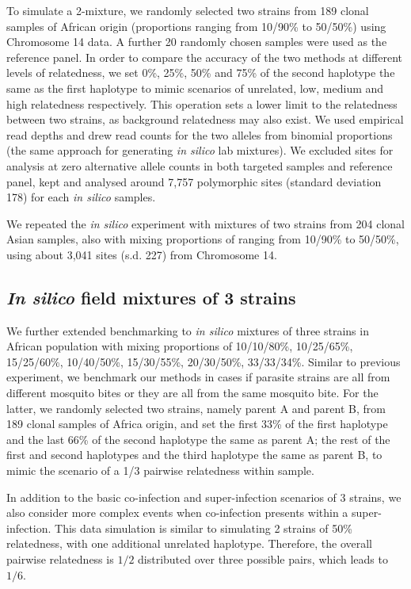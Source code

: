 \documentclass[9pt]{article}
\begin{document}
To simulate a 2-mixture, we randomly selected two strains from 189 clonal samples of African origin (proportions ranging from 10/90\% to 50/50\%) using Chromosome 14 data.  A further 20 randomly chosen samples were used as the reference panel. In order to compare the accuracy of the two methods at different levels of relatedness, we set 0\%, 25\%, 50\% and 75\% of the second haplotype the same as the first haplotype to mimic scenarios of unrelated, low, medium and high relatedness respectively. This operation sets a lower limit to the relatedness between two strains, as background relatedness may also exist. We used empirical read depths and drew read counts for the two alleles from binomial proportions (the same approach for generating {\it in silico} lab mixtures).
We excluded sites for analysis at zero alternative allele counts in both targeted samples and reference panel, kept and analysed around 7,757 polymorphic sites (standard deviation 178) for each {\it in silico} samples.


We repeated the \emph{in silico} experiment with mixtures of two strains from 204 clonal Asian samples, also with mixing proportions of ranging from 10/90\% to 50/50\%, using about 3,041 sites (s.d. 227) from Chromosome 14.

\subsection{{\it In silico} field mixtures of 3 strains}

We further extended benchmarking to \emph{in silico} mixtures of three strains in African population with mixing proportions of 10/10/80\%, 10/25/65\%, 15/25/60\%, 10/40/50\%, 15/30/55\%, 20/30/50\%, 33/33/34\%. Similar to previous experiment, we benchmark our methods in cases if parasite strains are all from different mosquito bites or they are all from the same mosquito bite. For the latter, we randomly selected two strains, namely parent A and parent B, from 189 clonal samples of Africa origin, and set the first 33\% of the first haplotype and the last 66\% of the second haplotype the same as parent A; the rest of the first and second haplotypes and the third haplotype the same as parent B, to mimic the scenario of a 1/3 pairwise relatedness within sample.

In addition to the basic co-infection and super-infection scenarios of 3 strains, we also consider more complex events when co-infection presents within a super-infection. This data simulation is similar to simulating 2 strains of 50\% relatedness, with one additional unrelated haplotype. Therefore, the overall pairwise relatedness is $1/2$ distributed over three possible pairs, which leads to $1/6$.
\end{document}
